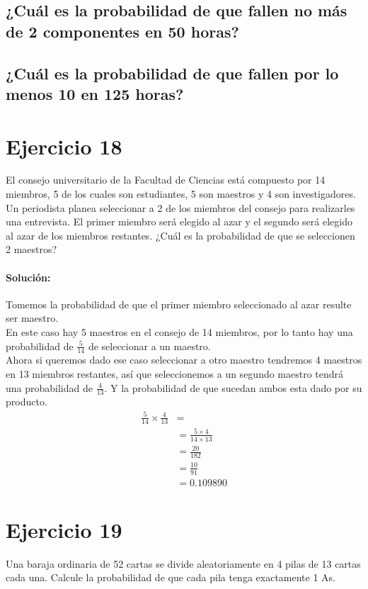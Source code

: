 \documentclass[12pt]{article}
\begin{document}
\subsection{¿Cuál es la probabilidad de que fallen no más de 2 componentes en 50 horas?}
\subsection{¿Cuál es la probabilidad de que fallen por lo menos 10 en 125 horas?}
\section{Ejercicio 18}
 El consejo universitario de la Facultad de Ciencias está compuesto por 14 miembros, 5 de los
cuales son estudiantes, 5 son maestros y 4 son investigadores. Un periodista planea seleccionar
a 2 de los miembros del consejo para realizarles una entrevista. El primer miembro será elegido
al azar y el segundo será elegido al azar de los miembros restantes. ¿Cuál es la probabilidad
de que se seleccionen 2 maestros?
\paragraph{Solución: } Tomemos la probabilidad de que el primer miembro seleccionado al azar resulte ser maestro.\\
En este caso hay 5 maestros en el consejo de 14 miembros, por lo tanto hay una probabilidad de $\frac{5}{14}$ de seleccionar a un maestro.\\
Ahora si queremos dado ese caso seleccionar a otro maestro tendremos 4 maestros en 13 miembros restantes, así que seleccionemos a un segundo maestro tendrá una probabilidad de $\frac{4}{13}$.
Y la probabilidad de que sucedan ambos esta dado por su producto.\\
\begin{equation}
	\begin{split}
	\frac{5}{14} \times \frac{4}{13}&=\\
	&=\frac{5\times 4}{14 \times 13} \\
	&=\frac{20}{182} \\
	&=\frac{10}{91}\\
	&= 0.109890
	\end{split}
\end{equation}
\section{Ejercicio 19}
Una baraja ordinaria de 52 cartas se divide aleatoriamente en 4 pilas de 13 cartas cada una.
Calcule la probabilidad de que cada pila tenga exactamente 1 As.
\end{document}
